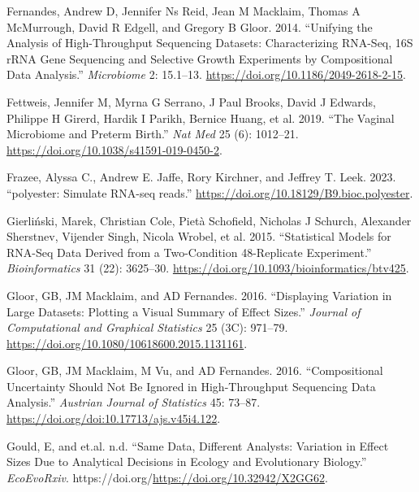 \documentclass[
]{article}
\newlength{\cslhangindent}
\newlength{\cslentryspacingunit} %
\newenvironment{CSLReferences}[2] %
 {%
  \setlength{\parindent}{0pt}
  \ifodd #1
  \let\oldpar\par
  \def\par{\hangindent=\cslhangindent\oldpar}
  \fi
  \setlength{\parskip}{#2\cslentryspacingunit}
 }%
 {}
\begin{document}
\begin{CSLReferences}{1}{0}
\leavevmode{}%
Fernandes, Andrew D, Jennifer Ns Reid, Jean M Macklaim, Thomas A
McMurrough, David R Edgell, and Gregory B Gloor. 2014. {``Unifying the
Analysis of High-Throughput Sequencing Datasets: Characterizing
{RNA}-Seq, 16{S} r{RNA} Gene Sequencing and Selective Growth Experiments
by Compositional Data Analysis.''} \emph{Microbiome} 2: 15.1--13.
\url{https://doi.org/10.1186/2049-2618-2-15}.

\leavevmode{}%
Fettweis, Jennifer M, Myrna G Serrano, J Paul Brooks, David J Edwards,
Philippe H Girerd, Hardik I Parikh, Bernice Huang, et al. 2019. {``The
Vaginal Microbiome and Preterm Birth.''} \emph{Nat Med} 25 (6):
1012--21. \url{https://doi.org/10.1038/s41591-019-0450-2}.

\leavevmode{}%
Frazee, Alyssa C., Andrew E. Jaffe, Rory Kirchner, and Jeffrey T. Leek.
2023. {``{polyester: Simulate RNA-seq reads}.''}
\url{https://doi.org/10.18129/B9.bioc.polyester}.

\leavevmode{}%
Gierliński, Marek, Christian Cole, Pietà Schofield, Nicholas J Schurch,
Alexander Sherstnev, Vijender Singh, Nicola Wrobel, et al. 2015.
{``Statistical Models for RNA-Seq Data Derived from a Two-Condition
48-Replicate Experiment.''} \emph{Bioinformatics} 31 (22): 3625--30.
\url{https://doi.org/10.1093/bioinformatics/btv425}.

\leavevmode{}%
Gloor, GB, JM Macklaim, and AD Fernandes. 2016. {``Displaying Variation
in Large Datasets: Plotting a Visual Summary of Effect Sizes.''}
\emph{Journal of Computational and Graphical Statistics} 25 (3C):
971--79. \url{https://doi.org/10.1080/10618600.2015.1131161}.

\leavevmode{}%
Gloor, GB, JM Macklaim, M Vu, and AD Fernandes. 2016. {``Compositional
Uncertainty Should Not Be Ignored in High-Throughput Sequencing Data
Analysis.''} \emph{Austrian Journal of Statistics} 45: 73--87.
\url{https://doi.org/doi:10.17713/ajs.v45i4.122}.

\leavevmode{}%
Gould, E, and et.al. n.d. {``Same Data, Different Analysts: Variation in
Effect Sizes Due to Analytical Decisions in Ecology and Evolutionary
Biology.''} \emph{EcoEvoRxiv}.
https://doi.org/\url{https://doi.org/10.32942/X2GG62}.


\end{CSLReferences}
\end{document}
